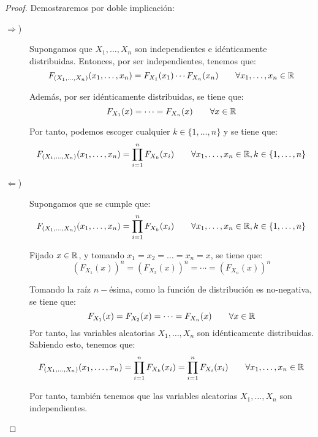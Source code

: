 \begin{proof}
    Demostraremos por doble implicación:
    \begin{description}
        \item[$\Longrightarrow$)] Supongamos que $X_1,\dots,X_n$ son independientes e idénticamente distribuidas. Entonces, por ser independientes, tenemos que:
        \begin{equation*}
            F_{(X_1,\dots,X_n)}(x_1,\dots,x_n) = F_{X_1}(x_1)\cdots F_{X_n}(x_n) \qquad \forall x_1,\dots,x_n\in \mathbb{R}
        \end{equation*}

        Además, por ser idénticamente distribuidas, se tiene que:
        \begin{equation*}
            F_{X_1}(x) = \cdots = F_{X_n}(x) \qquad \forall x\in \mathbb{R}
        \end{equation*}

        Por tanto, podemos escoger cualquier $k\in \{1,\dots,n\}$ y se tiene que:
        \begin{equation*}
            F_{(X_1,\dots,X_n)}(x_1,\dots,x_n) = \prod_{i=1}^{n}F_{X_k}(x_i) \qquad \forall x_1,\dots,x_n\in \mathbb{R}, k\in \{1,\dots,n\}
        \end{equation*}

        \item[$\Longleftarrow$)] Supongamos que se cumple que:
        \begin{equation*}
            F_{(X_1,\dots,X_n)}(x_1,\dots,x_n) = \prod_{i=1}^{n}F_{X_k}(x_i) \qquad \forall x_1,\dots,x_n\in \mathbb{R}, k\in \{1,\dots,n\}
        \end{equation*}

        Fijado $x\in \mathbb{R}$, y tomando $x_1=x_2=\dots=x_n=x$, se tiene que:
        \begin{equation*}
            (F_{X_1}(x))^n = (F_{X_2}(x))^n = \cdots = (F_{X_n}(x))^n
        \end{equation*}

        Tomando la raíz $n-$ésima, como la función de distribución es no-negativa, se tiene que:
        \begin{equation*}
            F_{X_1}(x) = F_{X_2}(x) = \cdots = F_{X_n}(x)\qquad \forall x\in \mathbb{R}
        \end{equation*}
        Por tanto, las variables aleatorias $X_1,\dots,X_n$ son idénticamente distribuidas.\\

        Sabiendo esto, tenemos que:
        \begin{equation*}
            F_{(X_1,\dots,X_n)}(x_1,\dots,x_n) = \prod_{i=1}^{n}F_{X_k}(x_i) = \prod_{i=1}^{n}F_{X_i}(x_i) \qquad \forall x_1,\dots,x_n\in \mathbb{R}
        \end{equation*}

        Por tanto, también tenemos que las variables aleatorias $X_1,\dots,X_n$ son independientes.
    \end{description}
\end{proof}

